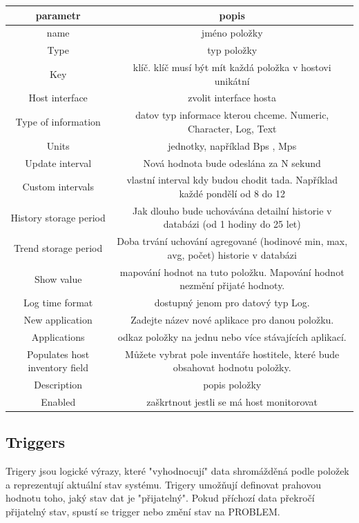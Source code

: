 \documentclass{article}
\begin{document}
  \begin{tabular}{ | c | c | }
    \hline
    parametr & popis  \\ \hline
    name & jméno položky \\ \hline
    Type & typ položky\\  \hline
    Key & klíč. klíč musí být mít každá položka v hostovi unikátní \\ \hline
    Host interface & zvolit interface hosta\\  \hline
    Type of information & datov typ informace kterou chceme. Numeric, Character, Log, Text \\ \hline
    Units & jednotky, například Bps , Mps \\ \hline
    Update interval & Nová hodnota bude odeslána za N sekund \\ \hline
    Custom intervals & vlastní interval kdy budou chodit tada. Například každé pondělí od 8 do 12 \\ \hline
    History storage period & Jak dlouho bude uchovávána detailní historie v databázi (od 1 hodiny do 25 let)\\ \hline
    Trend storage period & Doba trvání uchování agregované (hodinové min, max, avg, počet) historie v databázi  \\ \hline
    Show value & mapování hodnot na tuto položku. Mapování hodnot nezmění přijaté hodnoty.
\\ \hline
    Log time format & dostupný jenom pro datový typ Log. \\ \hline
    New application & Zadejte název nové aplikace pro danou položku. \\ \hline
    Applications & odkaz položky na jednu nebo více stávajících aplikací. \\ \hline
    Populates host inventory field & Můžete vybrat pole inventáře hostitele, které bude obsahovat hodnotu položky. \\ \hline
   Description & popis položky \\ \hline
    Enabled & zaškrtnout jestli se má host monitorovat \\ \hline
  \end{tabular}
 \subsection{Triggers}
 Trigery jsou logické výrazy, které "vyhodnocují" data shromážděná podle položek a reprezentují aktuální stav systému.\newline
 Trigery umožňují definovat prahovou hodnotu toho, jaký stav dat je "přijatelný". Pokud příchozí data překročí přijatelný stav, spustí se trigger nebo změní stav na PROBLEM.
\end{document}
